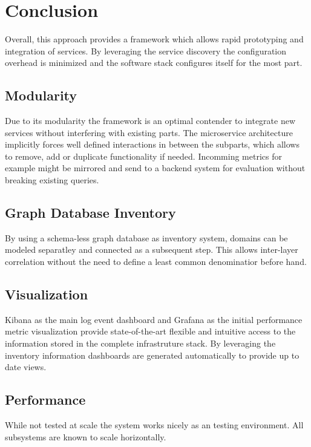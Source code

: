 \section{Conclusion}
Overall, this approach provides a framework which allows rapid prototyping and integration of services.
By leveraging the service discovery the configuration overhead is minimized and the software stack configures itself for the most part.

\subsection{Modularity}
Due to its modularity the framework is an optimal contender to integrate new services without interfering with existing parts.
The microservice architecture implicitly forces well defined interactions in between the subparts, which allows to remove, add or duplicate functionality if needed.
Incomming metrics for example might be mirrored and send to a backend system for evaluation without breaking existing queries.

\subsection{Graph Database Inventory}
By using a schema-less graph database as inventory system, domains can be modeled separatley and connected as a subsequent step. This allows inter-layer
correlation without the need to define a least common denominatior before hand.

\subsection{Visualization}
Kibana as the main log event dashboard and Grafana as the initial performance metric visualization provide
state-of-the-art flexible and intuitive access to the information stored in the complete infrastruture stack.
By leveraging the inventory information dashboards are generated automatically to provide up to date views.

\subsection{Performance}
While not tested at scale the system works nicely as an testing environment. All subsystems are known to scale horizontally.
